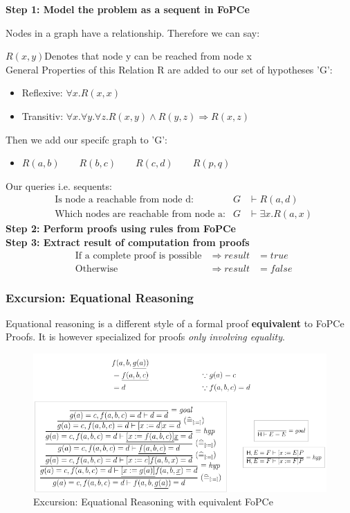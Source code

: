 \textbf{Step 1: Model the problem as a sequent in FoPCe } \newline

Nodes in a graph have a relationship. Therefore we can say: \newline

$R(x,y)$\qquad Denotes that node y can be reached from node x\\

General Properties of this Relation R are added to our set of hypotheses 'G':
\begin{itemize}
	\item Reflexive: $\forall x. R(x,x)$
	\item Transitiv: $\forall x.\forall y.\forall z. R(x,y) \land R(y,z) \Rightarrow R(x,z)$
\end{itemize}

Then we add our specifc graph to 'G':
\begin{itemize}
	\item $R(a,b) \qquad R(b,c) \qquad R(c,d) \qquad R(p,q)$
\end{itemize}


Our queries i.e. sequents:
\begin{align*}
	&\text{Is node a reachable from node d:} &G &\vdash R(a,d)\\
	&\text{Which nodes are reachable from node a:} &G &\vdash \exists x.R(a,x)
\end{align*}
\textbf{Step 2: Perform proofs using rules from FoPCe} \\
\textbf{Step 3: Extract result of computation from proofs}
\begin{align*}
	&\text{If a complete proof is possible} &\Rightarrow result &= true\\
	&\text{Otherwise} &\Rightarrow result &= false 
\end{align*}


\subsubsection{Excursion: Equational Reasoning}
Equational reasoning is a different style of a formal proof \textbf{equivalent} to FoPCe Proofs. It is however specialized for proofs \emph{only involving equality}.

\begin{figure}[H]
\centering
\includegraphics[width=0.8\linewidth]{images/fopce_equational_reasoning}
\caption{Excursion: Equational Reasoning with equivalent FoPCe}
\label{fig:fopceequationalreasoning}
\end{figure}

